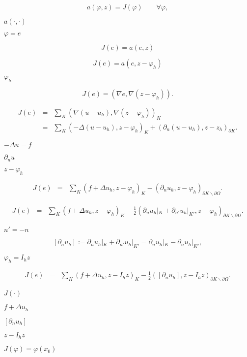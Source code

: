 \documentclass{article}
\begin{document}
\[ a(\varphi,z) = J(\varphi) \qquad \forall \varphi, \]
\pagebreak

$a(\cdot,\cdot)$
\pagebreak

$\varphi=e$
\pagebreak

\[ J(e) = a(e,z) \]
\pagebreak

\[ J(e) = a(e,z-\varphi_h) \]
\pagebreak

$\varphi_h$
\pagebreak

\[ J(e) = (\nabla e, \nabla(z-\varphi_h)). \]
\pagebreak

\begin{eqnarray*} J(e) &=& \sum_K (\nabla (u-u_h), \nabla (z-\varphi_h))_K \\ &=& \sum_K (-\Delta (u-u_h), z-\varphi_h)_K + (\partial_n (u-u_h), z-z_h)_{\partial K}. \end{eqnarray*}
\pagebreak

$-\Delta u=f$
\pagebreak

$\partial_n u$
\pagebreak

$z-\varphi_h$
\pagebreak

\begin{eqnarray*} J(e) &=& \sum_K (f+\Delta u_h, z-\varphi_h)_K - (\partial_n u_h, z-\varphi_h)_{\partial K\backslash \partial\Omega}. \end{eqnarray*}
\pagebreak

\begin{eqnarray*} J(e) &=& \sum_K (f+\Delta u_h, z-\varphi_h)_K - \frac 12 (\partial_n u_h|_K + \partial_{n'} u_h|_{K'}, z-\varphi_h)_{\partial K\backslash \partial\Omega}. \end{eqnarray*}
\pagebreak

$n'=-n$
\pagebreak

\[ [\partial_n u_h] := \partial_n u_h|_K + \partial_{n'} u_h|_{K'} = \partial_n u_h|_K - \partial_n u_h|_{K'}, \]
\pagebreak

$\varphi_h=I_h z$
\pagebreak

\begin{eqnarray*} J(e) &=& \sum_K (f+\Delta u_h, z-I_h z)_K - \frac 12 ([\partial_n u_h], z-I_h z)_{\partial K\backslash \partial\Omega}. \end{eqnarray*}
\pagebreak

$J(\cdot)$
\pagebreak

$f+\Delta u_h$
\pagebreak

$[\partial_n u_h]$
\pagebreak

$z-I_h z$
\pagebreak

$J(\varphi)=\varphi(x_0)$
\pagebreak
\end{document}
